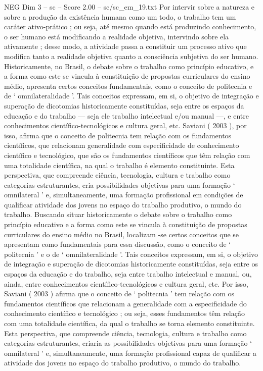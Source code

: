 \begin{textsample}{NEG Dim 3 – sc – Score 2.00 – sc/sc\_em\_19.txt}
Por intervir sobre a natureza e sobre a produção da existência humana como um todo, o trabalho tem um caráter ativo-prático ; ou seja, até mesmo quando está produzindo conhecimento, o ser humano está modificando a realidade objetiva, intervindo sobre ela ativamente ; desse modo, a atividade passa a constituir um processo ativo que modifica tanto a realidade objetiva quanto a consciência subjetiva do ser humano.
Historicamente, no Brasil, o debate sobre o trabalho como princípio educativo, e a forma como este se vincula à constituição de propostas curriculares do ensino médio, apresenta certos conceitos fundamentais, como o conceito de politecnia e de ‘ omnilateralidade ’.
Tais conceitos expressam, em si, o objetivo de integração e superação de dicotomias historicamente constituídas, seja entre os espaços da educação e do trabalho — seja ele trabalho intelectual e/ou manual —, e entre conhecimentos científico-tecnológicos e cultura geral, etc.
Saviani ( 2003 ), por isso, afirma que o conceito de politecnia tem relação com os fundamentos científicos, que relacionam generalidade com especificidade de conhecimento científico e tecnológico, que são os fundamentos científicos que têm relação com uma totalidade científica, na qual o trabalho é elemento constituinte.
Esta perspectiva, que compreende ciência, tecnologia, cultura e trabalho como categorias estruturantes, cria possibilidades objetivas para uma formação ‘ omnilateral ’ e, simultaneamente, uma formação profissional em condições de qualificar atividade dos jovens no espaço do trabalho produtivo, o mundo do trabalho.
Buscando situar historicamente o debate sobre o trabalho como princípio educativo e a forma como este se vincula à constituição de propostas curriculares do ensino médio no Brasil, localizam -se certos conceitos que se apresentam como fundamentais para essa discussão, como o conceito de ‘ politecnia ’ e o de ‘ omnilateralidade ’.
Tais conceitos expressam, em si, o objetivo de integração e superação de dicotomias historicamente constituídas, seja entre os espaços da educação e do trabalho, seja entre trabalho intelectual e manual, ou, ainda, entre conhecimentos científico-tecnológicos e cultura geral, etc.
Por isso, Saviani ( 2003 ) afirma que o conceito de ‘ politecnia ’ tem relação com os fundamentos científicos que relacionam a generalidade com a especificidade do conhecimento científico e tecnológico ; ou seja, esses fundamentos têm relação com uma totalidade científica, da qual o trabalho se torna elemento constituinte.
Esta perspectiva, que compreende ciência, tecnologia, cultura e trabalho como categorias estruturantes, criaria as possibilidades objetivas para uma formação ‘ omnilateral ’ e, simultaneamente, uma formação profissional capaz de qualificar a atividade dos jovens no espaço do trabalho produtivo, o mundo do trabalho.

\end{textsample}
